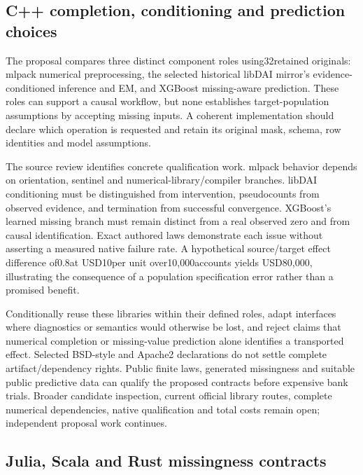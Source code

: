 \hypertarget{c-completion-conditioning-and-prediction-choices}{%
\subsection{C++ completion, conditioning and prediction
choices}\label{c-completion-conditioning-and-prediction-choices}}

The proposal compares three distinct component roles using32retained
originals: mlpack numerical preprocessing, the selected historical
libDAI mirror's evidence-conditioned inference and EM, and XGBoost
missing-aware prediction. These roles can support a causal workflow, but
none establishes target-population assumptions by accepting missing
inputs. A coherent implementation should declare which operation is
requested and retain its original mask, schema, row identities and model
assumptions.
\citep{exec25_ctm_mlpack,exec25_ctm_libdai,exec25_ctm_xgboost}

The source review identifies concrete qualification work. mlpack
behavior depends on orientation, sentinel and numerical-library/compiler
branches. libDAI conditioning must be distinguished from intervention,
pseudocounts from observed evidence, and termination from successful
convergence. XGBoost's learned missing branch must remain distinct from
a real observed zero and from causal identification. Exact authored laws
demonstrate each issue without asserting a measured native failure rate.
A hypothetical source/target effect difference of0.8at USD10per unit
over10,000accounts yields USD80,000, illustrating the consequence of a
population specification error rather than a promised benefit.
\citep{exec25_ctm_choice}

Conditionally reuse these libraries within their defined roles, adapt
interfaces where diagnostics or semantics would otherwise be lost, and
reject claims that numerical completion or missing-value prediction
alone identifies a transported effect. Selected BSD-style and Apache2
declarations do not settle complete artifact/dependency rights. Public
finite laws, generated missingness and suitable public predictive data
can qualify the proposed contracts before expensive bank trials. Broader
candidate inspection, current official library routes, complete
numerical dependencies, native qualification and total costs remain
open; independent proposal work continues.
\citep{exec25_ctm_mlpack,exec25_ctm_libdai,exec25_ctm_xgboost,exec25_ctm_choice}

\hypertarget{julia-scala-and-rust-missingness-contracts}{%
\subsection{Julia, Scala and Rust missingness
contracts}\label{julia-scala-and-rust-missingness-contracts}}

